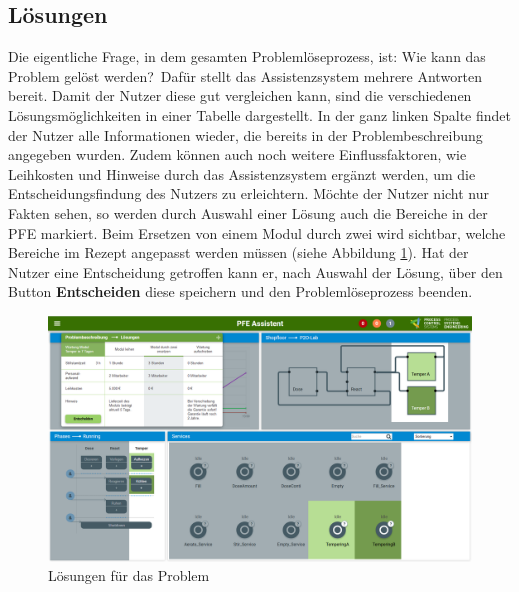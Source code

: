 \subsection{Lösungen}
\label{4:pD-Loesungen}
Die eigentliche Frage, in dem gesamten Problemlöseprozess, ist: \glqq Wie kann das Problem gelöst werden?\grqq  \ Dafür stellt das Assistenzsystem mehrere Antworten bereit. Damit der Nutzer diese gut vergleichen kann, sind die verschiedenen Lösungsmöglichkeiten in einer Tabelle dargestellt. In der ganz linken Spalte findet der Nutzer alle Informationen wieder, die bereits in der Problembeschreibung angegeben wurden. Zudem können auch noch weitere Einflussfaktoren, wie Leihkosten und Hinweise durch das Assistenzsystem ergänzt werden, um die Entscheidungsfindung des Nutzers zu erleichtern. Möchte der Nutzer nicht nur Fakten sehen, so werden durch Auswahl einer Lösung auch die Bereiche in der PFE markiert. Beim Ersetzen von einem Modul durch zwei wird sichtbar, welche Bereiche im Rezept angepasst werden müssen (siehe Abbildung \ref{pic:pD-Loesungen}). Hat der Nutzer eine Entscheidung getroffen kann er, nach Auswahl der Lösung, über den Button \textbf{Entscheiden} diese speichern und den Problemlöseprozess beenden.
\begin{figure}[htbp]
\centering
\includegraphics[angle=90,scale=0.47]{DA_files/Bilder/Konzept/Skizze-Loesungen-PFE.png}
\caption{Lösungen für das Problem}
\label{pic:pD-Loesungen}
\end{figure}

